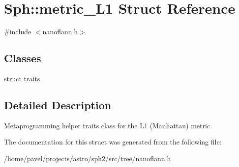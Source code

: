 \hypertarget{structSph_1_1metric__L1}{}\section{Sph\+:\+:metric\+\_\+\+L1 Struct Reference}
\label{structSph_1_1metric__L1}


{\ttfamily \#include $<$nanoflann.\+h$>$}

\subsection*{Classes}
\begin{DoxyCompactItemize}
\item 
struct \hyperlink{structSph_1_1metric__L1_1_1traits}{traits}
\end{DoxyCompactItemize}


\subsection{Detailed Description}
Metaprogramming helper traits class for the L1 (Manhattan) metric 

The documentation for this struct was generated from the following file\+:\begin{DoxyCompactItemize}
\item 
/home/pavel/projects/astro/sph2/src/tree/nanoflann.\+h\end{DoxyCompactItemize}
